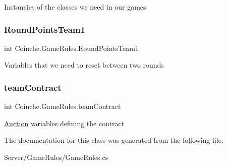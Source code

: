 Instancies of the classes we need in our games 

\mbox{\label{class_coinche_1_1_game_rules_ad6de66a1c81a21e14ad8c91fdc785647}} 
\subsubsection{\texorpdfstring{Round\+Points\+Team1}{RoundPointsTeam1}}
{\footnotesize\ttfamily int Coinche.\+Game\+Rules.\+Round\+Points\+Team1\hspace{0.3cm}{\ttfamily [private]}}



Variables that we need to reset between two rounds 

\mbox{\label{class_coinche_1_1_game_rules_aeff13015478623c4910c1ceac846828e}} 
\subsubsection{\texorpdfstring{team\+Contract}{teamContract}}
{\footnotesize\ttfamily int Coinche.\+Game\+Rules.\+team\+Contract\hspace{0.3cm}{\ttfamily [private]}}



\hyperlink{class_coinche_1_1_auction}{Auction} variables defining the contract 



The documentation for this class was generated from the following file\+:\begin{DoxyCompactItemize}
\item 
Server/\+Game\+Rules/Game\+Rules.\+cs\end{DoxyCompactItemize}
